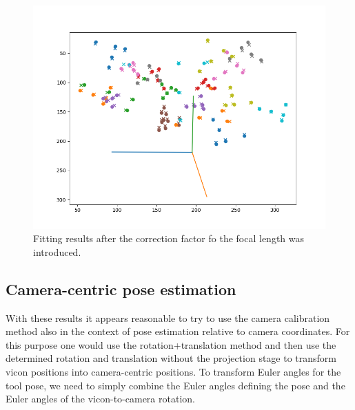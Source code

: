 \documentclass{article}
\begin{document}
\begin{figure}
  \includegraphics[width=\textwidth]{figure_match_euler.png}
  \caption{\label{figure3} Fitting results after the correction factor fo the focal length was introduced.}
\end{figure}

\subsection{Camera-centric pose estimation}
With these results it appears reasonable to try to use the camera calibration method also in the context of pose estimation relative to camera coordinates. For this purpose one would use the rotation+translation method and then use the determined rotation and translation without the projection stage to transform vicon positions into camera-centric positions. To transform Euler angles for the tool pose, we need to simply combine the Euler angles defining the pose and the Euler angles of the vicon-to-camera rotation.
\end{document}
